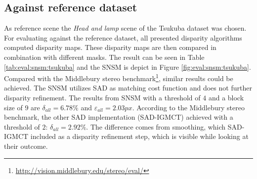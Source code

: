 


\newpage
\subsection{Against reference dataset}

As reference scene the \textit{Head and lamp} scene of the Tsukuba dataset was chosen.
For evaluating against the reference dataset, all presented disparity algorithms computed disparity maps.
These disparity maps are then compared in combination with different masks.
The result can be seen in Table \ref{tab:eval:snsm:tsukuba} and the SNSM is depict in Figure \ref{fig:eval:snsm:tsukuba}.
Compared with the Middlebury stereo benchmark\footnote{\url{http://vision.middlebury.edu/stereo/eval/}}, similar results could be achieved.
The SNSM utilizes SAD as matching cost function and does not further disparity refinement.
The results from SNSM with a threshold of $4$ and a block size of $9$ are $\delta_{all} = 6.78\%$ and $\varepsilon_{all} = 2.03px$.
According to the Middlebury stereo benchmark, the other SAD implementation (SAD-IGMCT) \citep{ambrosch2010accurate} achieved with a threshold of $2$: $\delta_{all} = 2.92\%$.
The difference comes from smoothing, which SAD-IGMCT included as a disparity refinement step, which is visible while looking at their outcome.


